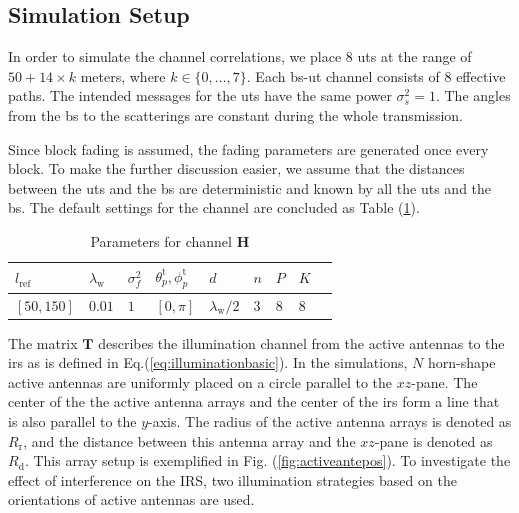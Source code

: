 \documentclass[12pt,draftclsnofoot,onecolumn,journal]{IEEEtran}
\begin{document}
\subsection{Simulation Setup}
In order to simulate the channel correlations, we place $8$ \acp{ut} at the range of $50+14\times k$ meters, where $k\in\{0,\dots, 7\}$. Each \ac{bs}-\ac{ut} channel consists of $8$ effective paths. The intended messages for the \acp{ut} have the same power $\sigma_s^2=1$. The angles from the \ac{bs} to the scatterings are constant during the whole transmission. 

Since block fading is assumed, the fading parameters are generated once every block. To make the further discussion easier, we assume that the distances between the \acp{ut} and the \ac{bs} are deterministic and known by all the \acp{ut} and the \ac{bs}.
The default settings for the channel are concluded as Table (\ref{table:parametersforthechannel}).
\begin{table}
\begin{tabularx} {1\textwidth}{ 
  | >{\centering\arraybackslash}X 
  | >{\centering\arraybackslash}X 
  | >{\centering\arraybackslash}X
  | >{\centering\arraybackslash}X 
  | >{\centering\arraybackslash}X
  | >{\centering\arraybackslash}X
  | >{\centering\arraybackslash}X
  | >{\centering\arraybackslash}X
  | >{\centering\arraybackslash}X | }
 \hline
 $l_{\mathrm{ref}}$		& $\lambda_{\mathrm{w}}$ 	& $\sigma_f^2$	& $\theta_p^{\mathrm t}, \phi_p^{\mathrm t}$	&$d$& $n$& $P$ & $K$\\
 \hline
 $[50, 150]$	& $0.01$ 			& $1$ 				&$[0, \pi]$ 					&$\lambda_{\mathrm{w}}/2$&$3$& $8$ & $8$\\
\hline
\end{tabularx}
\caption{Parameters for channel $\mathbf H$}
\label{table:parametersforthechannel}
\end{table}

The matrix $\mathbf T$ describes the illumination channel from the active antennas to the \ac{irs} as is defined in Eq.(\ref{eq:illuminationbasic}).
In the simulations, $N$ horn-shape active antennas are uniformly placed on a circle parallel to the $xz$-pane. 
The center of the the active antenna arrays and the center of the \ac{irs} form a line that is also parallel to the $y$-axis.
The radius of the active antenna arrays is denoted as $R_{\mathrm r}$, and the distance between this antenna array and the $xz$-pane is denoted as $R_{\mathrm d}$. 
This array setup is exemplified in Fig. (\ref{fig:activeantepos}).
To investigate the effect of interference on the IRS, two illumination strategies based on the orientations of active antennas are used. 
\end{document}
